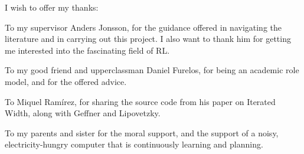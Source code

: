 
I wish to offer my thanks:

To my supervisor Anders Jonsson, for the guidance offered in navigating the
literature and in carrying out this project. I also want to thank him for
getting me interested into the fascinating field of \acs{RL}.

To my good friend and upperclassman Daniel Furelos, for being an academic role
model, and for the offered advice.

To Miquel Ramírez, for sharing the source code from his paper on Iterated Width,
along with Geffner and Lipovetzky.

To my parents and sister for the moral support, and the support of a noisy,
electricity-hungry computer that is continuously learning and planning.